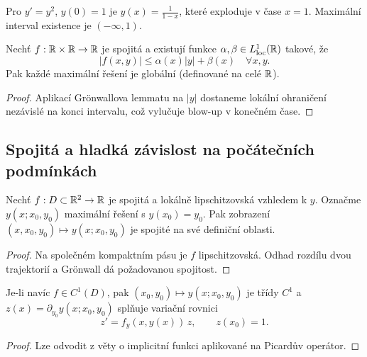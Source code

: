 \begin{example}
\label{ex:blow-up}
Pro $y'=y^2$, $y(0)=1$ je $y(x)=\frac{1}{1-x}$, které exploduje v čase $x=1$. Maximální interval existence je $(-\infty,1)$.
\end{example}

\begin{theorem}
\label{vet:a-priori}
Nechť $f:\mathbb{R}\times\mathbb{R}\to\mathbb{R}$ je spojitá a existují funkce $\alpha,\beta\in L^1_{\mathrm{loc}}(\mathbb{R})$ takové, že
\[
|f(x,y)|\le \alpha(x)|y|+\beta(x)\quad \forall x,y.
\]
Pak každé maximální řešení je globální (definované na celé $\mathbb{R}$).
\end{theorem}

\begin{proof}
Aplikací Gr\"onwallova lemmatu na $|y|$ dostaneme lokální ohraničení nezávislé na konci intervalu, což vylučuje blow-up v konečném čase.
\end{proof}

\spc

\subsection{Spojitá a hladká závislost na počátečních podmínkách}
\label{sec:spojita-zavislost}

\begin{theorem}
\label{vet:spojita-zavislost}
Nechť $f:D\subset\mathbb{R}^2\to\mathbb{R}$ je spojitá a lokálně lipschitzovská vzhledem k $y$. Označme $y(x;x_0,y_0)$ maximální řešení s $y(x_0)=y_0$. 
Pak zobrazení $(x,x_0,y_0)\mapsto y(x;x_0,y_0)$ je spojité na své definiční oblasti.
\end{theorem}

\begin{proof}
Na společném kompaktním pásu je $f$ lipschitzovská. Odhad rozdílu dvou trajektorií a Gr\"onwall dá požadovanou spojitost.
\end{proof}

\begin{theorem}
\label{vet:diff-zavislost}
Je-li navíc $f\in C^1(D)$, pak $(x_0,y_0)\mapsto y(x;x_0,y_0)$ je třídy $C^1$ a 
$z(x)=\partial_{y_0}y(x;x_0,y_0)$ splňuje variační rovnici
\[
z'=f_y(x,y(x))\,z,\qquad z(x_0)=1.
\]
\end{theorem}

\begin{proof}
Lze odvodit z věty o implicitní funkci aplikované na Picardův operátor.
\end{proof}

